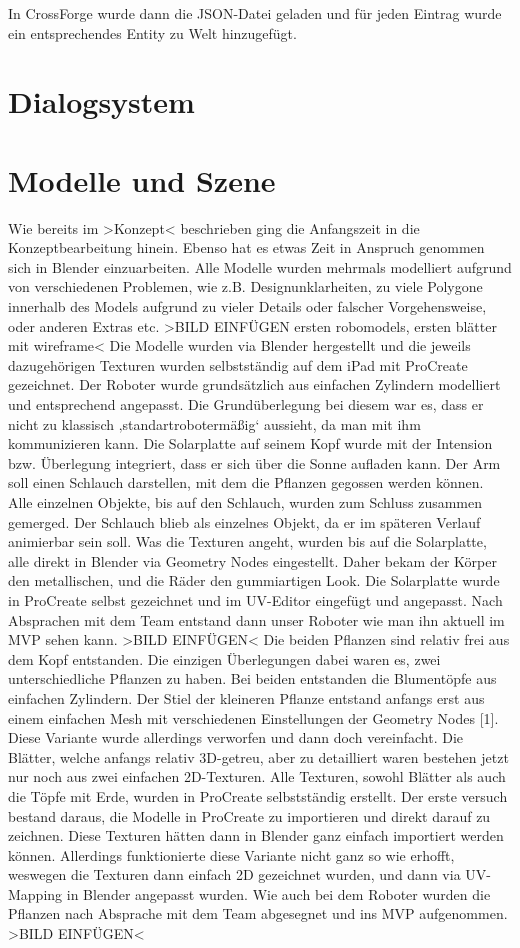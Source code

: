 In CrossForge wurde dann die JSON-Datei geladen und für jeden Eintrag wurde ein entsprechendes Entity zu Welt hinzugefügt.

\section{Dialogsystem}

\section{Modelle und Szene}

Wie bereits im >Konzept< beschrieben ging die Anfangszeit in die Konzeptbearbeitung hinein. Ebenso hat es etwas Zeit in Anspruch genommen sich in Blender einzuarbeiten. Alle Modelle wurden mehrmals modelliert aufgrund von verschiedenen Problemen, wie z.B. Designunklarheiten, zu viele Polygone innerhalb des Models aufgrund zu vieler Details oder falscher Vorgehensweise, oder anderen Extras etc. >BILD EINFÜGEN ersten robomodels, ersten blätter mit wireframe<
Die Modelle wurden via Blender hergestellt und die jeweils dazugehörigen Texturen wurden selbstständig auf dem iPad mit ProCreate gezeichnet.
Der Roboter wurde grundsätzlich aus einfachen Zylindern modelliert und entsprechend angepasst. Die Grundüberlegung bei diesem war es, dass er nicht zu klassisch ‚standartrobotermäßig‘ aussieht, da man mit ihm kommunizieren kann. Die Solarplatte auf seinem Kopf wurde mit der Intension bzw. Überlegung integriert, dass er sich über die Sonne aufladen kann. Der Arm soll einen Schlauch darstellen, mit dem die Pflanzen gegossen werden können. Alle einzelnen Objekte, bis auf den Schlauch, wurden zum Schluss zusammen gemerged. Der Schlauch blieb als einzelnes Objekt, da er im späteren Verlauf animierbar sein soll. Was die Texturen angeht, wurden bis auf die Solarplatte, alle direkt in Blender via Geometry Nodes eingestellt. Daher bekam der Körper den metallischen, und die Räder den gummiartigen Look. Die Solarplatte wurde in ProCreate selbst gezeichnet und im UV-Editor eingefügt und angepasst. Nach Absprachen mit dem Team entstand dann unser Roboter wie man ihn aktuell im MVP sehen kann. >BILD EINFÜGEN<
Die beiden Pflanzen sind relativ frei aus dem Kopf entstanden. Die einzigen Überlegungen dabei waren es, zwei unterschiedliche Pflanzen zu haben. Bei beiden entstanden die Blumentöpfe aus einfachen Zylindern. Der Stiel der kleineren Pflanze entstand anfangs erst aus einem einfachen Mesh mit verschiedenen Einstellungen der Geometry Nodes [1]. Diese Variante wurde allerdings verworfen und dann doch vereinfacht. Die Blätter, welche anfangs relativ 3D-getreu, aber zu detailliert waren bestehen jetzt nur noch aus zwei einfachen 2D-Texturen. Alle Texturen, sowohl Blätter als auch die Töpfe mit Erde, wurden in ProCreate selbstständig erstellt. Der erste versuch bestand daraus, die Modelle in ProCreate zu importieren und direkt darauf zu zeichnen. Diese Texturen hätten dann in Blender ganz einfach importiert werden können. Allerdings funktionierte diese Variante nicht ganz so wie erhofft, weswegen die Texturen dann einfach 2D gezeichnet wurden, und dann via UV-Mapping in Blender angepasst wurden. Wie auch bei dem Roboter wurden die Pflanzen nach Absprache mit dem Team abgesegnet und ins MVP aufgenommen. >BILD EINFÜGEN<
